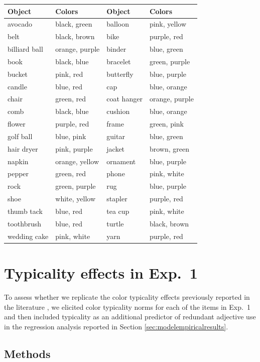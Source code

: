 \documentclass[11pt]{article}
\newcommand{\sectionref}[1]{Section \ref{#1}}
\begin{document}
\begin{tabular}{l l l l}
\toprule
Object & Colors & Object & Colors \\
\midrule
avocado & black, green & balloon & pink, yellow \\
belt & black, brown & bike & purple, red\\
billiard ball & orange, purple & binder & blue, green \\
book & black, blue & bracelet & green, purple \\
bucket & pink, red & butterfly & blue, purple\\
candle & blue, red & cap & blue, orange \\
chair & green, red & coat hanger & orange, purple \\
comb & black, blue & cushion & blue, orange\\
flower & purple, red & frame & green, pink \\
golf ball & blue, pink & guitar & blue, green\\
hair dryer & pink, purple & jacket & brown, green\\
napkin & orange, yellow & ornament & blue, purple\\
pepper & green, red & phone & pink, white\\
rock & green, purple & rug & blue, purple \\
shoe & white, yellow & stapler & purple, red\\
thumb tack & blue, red & tea cup & pink, white \\
toothbrush & blue, red & turtle & black, brown \\
wedding cake & pink, white & yarn & purple, red\\
\bottomrule
\end{tabular}

\section{Typicality effects in Exp.~1}
\label{sec:exp1typicality}

To assess whether we replicate the color typicality effects previously reported in the literature \cite{sedivy2003a, Westerbeek2015, rubiofernandez2016}, we elicited color typicality norms for each of the items in Exp.~1 and then included typicality as an additional predictor of redundant adjective use in the regression analysis reported in \sectionref{sec:modelempiricalresults}. 

\subsection{Methods}
\end{document}
